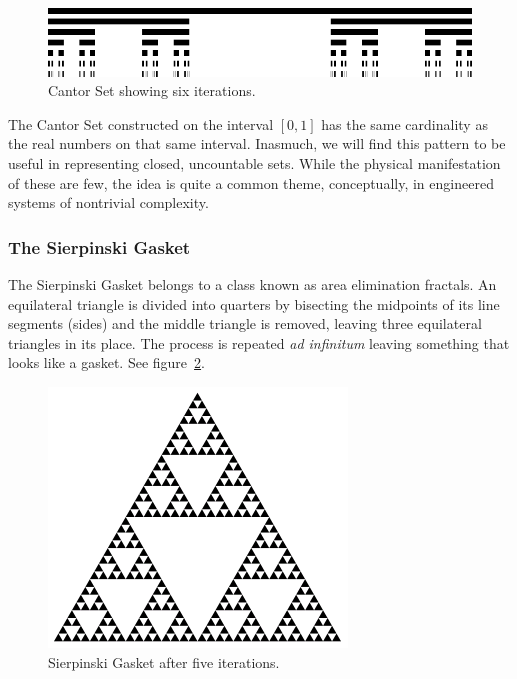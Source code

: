 \documentclass[jou,apacite]{apa6}
\begin{document}
\begin{figure}[htpb]
  \centering
  \includegraphics[width=0.75\columnwidth]{images/cantorset.png}
  \caption{Cantor Set showing six iterations.}
  \label{fig:cantor}
\end{figure}

The Cantor Set constructed on the interval $[0, 1]$ has the same cardinality as the real numbers on that same interval.  Inasmuch, we will find this pattern to be useful in representing closed, uncountable sets.  While the physical manifestation of these are few, the idea is quite a common theme, conceptually, in engineered systems of nontrivial complexity.

\subsubsection{The Sierpinski Gasket}
The Sierpinski Gasket belongs to a class known as area elimination fractals.  An equilateral triangle is divided into quarters by bisecting the midpoints of its line segments (sides) and the middle triangle is removed, leaving three equilateral triangles in its place.  The process is repeated \emph{ad infinitum} leaving something that looks like a gasket.  See figure~\ref{fig:sierpinski}.

\begin{figure}[htpb]
  \centering
  \includegraphics[width=0.75\columnwidth]{images/sierpinski.png}
  \caption{Sierpinski Gasket after five iterations.}
  \label{fig:sierpinski}
\end{figure}
\end{document}
